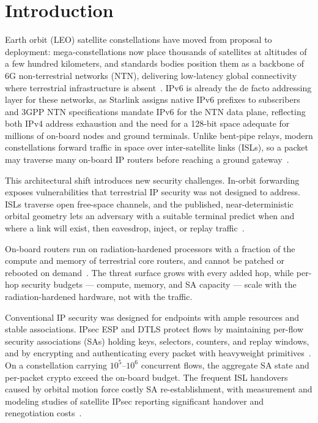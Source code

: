 \section{Introduction}
\label{sec:intro}

 Earth orbit (LEO) satellite constellations have moved from
proposal to deployment: mega-constellations now place thousands of satellites
at altitudes of a few hundred kilometers, and standards bodies position them as
a backbone of 6G non-terrestrial networks (NTN), delivering low-latency global
connectivity where terrestrial infrastructure is absent~\cite{mahboob,kodheli2021,3gppntn}. IPv6 is already the de facto addressing layer for these
networks, as Starlink assigns native IPv6 prefixes to subscribers and 3GPP NTN
specifications mandate IPv6 for the NTN data plane, reflecting both IPv4 address
exhaustion and the need for a 128-bit space adequate for millions of on-board
nodes and ground terminals. Unlike bent-pipe relays, modern constellations forward
traffic in space over inter-satellite links (ISLs), so a packet may traverse
many on-board IP routers before reaching a ground gateway~\cite{bhattacherjee2022}.

This architectural shift introduces new security challenges. In-orbit forwarding exposes vulnerabilities that terrestrial IP security was not designed to address. ISLs traverse open free-space channels, and the published, near-deterministic
orbital geometry lets an adversary with a suitable terminal predict when and
where a link will exist, then eavesdrop, inject, or replay
traffic~\cite{yue,du2025leosec,tang2026satdef,salim2024satcybersec}.

On-board routers run on radiation-hardened processors
with a fraction of the compute and memory of terrestrial core routers, and
cannot be patched or rebooted on demand~\cite{denby}. The threat surface grows with every added hop, while per-hop security budgets --- compute, memory, and SA capacity --- scale with the radiation-hardened hardware, not with the traffic.


Conventional IP security was designed for endpoints with ample resources and
stable associations. IPsec ESP and DTLS protect flows by maintaining
per-flow security associations (SAs) holding keys, selectors, counters, and
replay windows, and by encrypting and authenticating every packet with
heavyweight primitives~\cite{rfc4301,rfc6347}. On a constellation carrying $10^5$--$10^6$ concurrent flows, the
aggregate SA state and per-packet crypto exceed the on-board budget. The
frequent ISL handovers caused by orbital motion force costly SA
re-establishment, with measurement and modeling studies of satellite IPsec
reporting significant handover and renegotiation costs~\cite{yue}.

